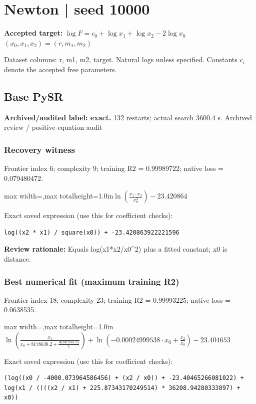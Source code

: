 \documentclass[10pt,letterpaper,landscape]{article}
\begin{document}
\section*{Newton | seed 10000}
\textbf{Accepted target:} $\displaystyle \log F=c_0+\log x_1+\log x_2-2\log x_0$\hfill $(x_0,x_1,x_2)=(r,m_1,m_2)$\par
{\small Dataset columns: r, m1, m2, target. Natural logs unless specified. Constants $c_i$ denote the accepted free parameters.}\par\medskip
\begin{minipage}[t]{0.485\textwidth}
\subsection*{Base PySR}
\textbf{Archived/audited label: exact.} 132 restarts; actual search 3600.4 s.
{\small Archived review / positive-equation audit}
\subsubsection*{Recovery witness}
Frontier index 6; complexity 9; training R2 = 0.99989722; native loss = 0.079480472.
\begin{center}\begin{adjustbox}{max width=\linewidth,max totalheight=1.0in}$\displaystyle \ln{\left(\frac{x_{1} \cdot x_{2}}{x_{0}^{2}} \right)} - 23.420864$\end{adjustbox}\end{center}
{\scriptsize Exact saved expression (use this for coefficient checks):}
\begin{lstlisting}
log((x2 * x1) / square(x0)) + -23.420863922221596
\end{lstlisting}
{\small\textbf{Review rationale:} Equals log(x1*x2/x0\textasciicircum{}2) plus a fitted constant; x0 is distance.}
\subsubsection*{Best numerical fit (maximum training R2)}
Frontier index 18; complexity 23; training R2 = 0.99993225; native loss = 0.0638535.
\begin{center}\begin{adjustbox}{max width=\linewidth,max totalheight=1.0in}$\displaystyle \ln{\left(\frac{x_{1}}{x_{0} + 8178638.2 + \frac{36208.943 \cdot x_{2}}{x_{1}}} \right)} + \ln{\left(- 0.00024999538 \cdot x_{0} + \frac{x_{2}}{x_{0}} \right)} - 23.404653$\end{adjustbox}\end{center}
{\scriptsize Exact saved expression (use this for coefficient checks):}
\begin{lstlisting}
(log((x0 / -4000.073964586456) + (x2 / x0)) + -23.40465266081022) + log(x1 / ((((x2 / x1) + 225.87343170249514) * 36208.94280333897) + x0))
\end{lstlisting}
\end{minipage}\hfill
\end{document}
